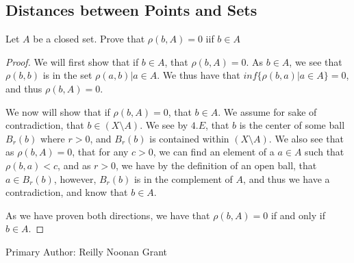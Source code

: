 \subsection{Distances between Points and Sets}

\begin{majorEx}
  Let $A$ be a closed set. Prove that $\rho(b,A)=0$ iif $b\in A$
\end{majorEx}

\begin{proof}
  We will first show that if $b\in A$, that $\rho(b,A)=0$. As $b\in A$, we see 
  that $\rho(b,b)$ is in the set $\rho(a,b) | a \in A$. We thus have that 
  $inf \{ \rho(b,a)| a\in A\}=0$, and thus $\rho(b,A)=0$.

  We now will show that if $\rho(b,A)=0$, that $b\in A$. We assume for sake 
  of contradiction, that $b \in (X \setminus A)$. We see by $4.E$, 
  that $b$ is the center of some ball $B_r(b)$ where $r>0$, and $B_r(b)$ is 
  contained within $(X \setminus A)$. We also see that as $\rho(b,A)=0$, that for any $c>0$, we can find an element of a $a\in A$ such that $\rho(b,a)<c$, and as $r>0$, we have by the definition of an open ball, that $a\in B_r(b)$, however, $B_r(b)$ is in the complement of $A$, and thus we have a contradiction, and know that $b\in A$.
  
  As we have proven both directions, we have that $\rho(b,A) =0$ if and only if $b\in A$.
\end{proof}
Primary Author: Reilly Noonan Grant
